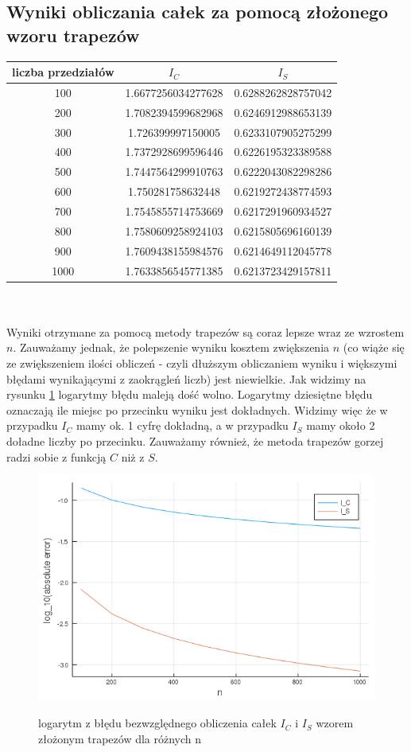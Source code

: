\documentclass{article}
\begin{document}
\subsection*{Wyniki obliczania całek za pomocą złożonego wzoru trapezów}
\begin{tabular}{|c|c|c|} \hline
liczba przedziałów & $I_C$ & $I_S$ \\ \hline \hline
100 & 1.6677256034277628 & 0.6288262828757042 \\ \hline
200 & 1.7082394599682968 & 0.6246912988653139 \\ \hline
300 & 1.726399997150005  & 0.6233107905275299 \\ \hline
400 & 1.7372928699596446 & 0.6226195323389588 \\ \hline
500 & 1.7447564299910763 & 0.6222043082298286 \\ \hline
600 & 1.750281758632448  & 0.6219272438774593 \\ \hline
700 & 1.7545855714753669 & 0.6217291960934527 \\ \hline
800 & 1.7580609258924103 & 0.6215805696160139 \\ \hline
900 & 1.7609438155984576 & 0.6214649112045778 \\ \hline
1000& 1.7633856545771385 & 0.6213723429157811 \\ \hline
\end{tabular}\\
\\
Wyniki otrzymane za pomocą metody trapezów są coraz lepsze wraz ze wzrostem $n$. Zauważamy jednak, że polepszenie wyniku kosztem zwiększenia $n$ (co wiąże się ze zwiększeniem ilości obliczeń - czyli dłuższym obliczaniem wyniku i większymi błędami wynikającymi z zaokrągleń liczb) jest niewielkie. Jak widzimy na rysunku \ref{wykresA} logarytmy błędu maleją dość wolno. Logarytmy dziesiętne błędu oznaczają ile miejsc po przecinku wyniku jest dokładnych. Widzimy więc że w przypadku $I_C$ mamy ok. 1 cyfrę dokładną, a w przypadku $I_S$ mamy około 2 doładne liczby po przecinku. Zauważamy również, że metoda trapezów gorzej radzi sobie z funkcją $C$ niż z $S$.
\begin{figure}[ht]
    \includegraphics[scale=0.5]{WykresAlogabsolute.png}
    \label{wykresA}
    \caption{logarytm z błędu bezwzględnego obliczenia całek $I_C$ i $I_S$ wzorem złożonym trapezów dla różnych n}
\end{figure}
\end{document}
